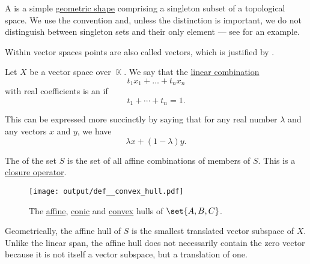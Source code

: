 \begin{definition}\label{def:point}
  A  is a simple \hyperref[def:geometric_shape]{geometric shape} comprising a singleton subset of a topological space. We use the convention  and, unless the distinction is important, we do not distinguish between singleton sets and their only element --- see  for an example.

  Within vector spaces points are also called vectors, which is justified by .
\end{definition}

\begin{definition}\label{def:affine_hull}\mimprovised
  Let \( X \) be a vector space over \( \BbbK \). We say that the \hyperref[rem:linear_combinations]{linear combination}
  \begin{equation*}
    t_1 x_1 + \ldots + t_n x_n
  \end{equation*}
  with real coefficients is an  if
  \begin{equation*}
    t_1 + \cdots + t_n = 1.
  \end{equation*}

  This can be expressed more succinctly by saying that for any real number \( \lambda \) and any vectors \( x \) and \( y \), we have
  \begin{equation}\label{eq:def:affine_hull/combination}
    \lambda x + (1 - \lambda) y.
  \end{equation}

  The  of the set \( S \) is the set of all affine combinations of members of \( S \). This is a \hyperref[def:closure_operator]{closure operator}.

  \begin{figure}[!ht]
    \centering
    \texttt{[image: output/def\_\_convex\_hull.pdf]}
    \caption{The \hyperref[def:affine_hull]{affine}, \hyperref[def:conic_hull]{conic} and \hyperref[def:convex_hull]{convex} hulls of \( \set{ A, B, C } \).}\label{fig:def:convex_hull}
  \end{figure}

  Geometrically, the affine hull of \( S \) is the smallest translated vector subspace of \( X \). Unlike the linear span, the affine hull does not necessarily contain the zero vector because it is not itself a vector subspace, but a translation of one.
\end{definition}
